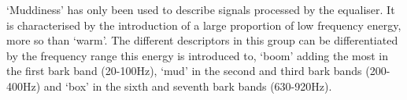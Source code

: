 	`Muddiness' has only been used to describe signals processed by the equaliser. It is characterised by the
	introduction of a large proportion of low frequency energy, more so than `warm'. The different descriptors in this
	group can be differentiated by the frequency range this energy is introduced to, `boom' adding the most in the
	first bark band (20-100Hz), `mud' in the second and third bark bands (200-400Hz) and `box' in the sixth and seventh
	bark bands (630-920Hz).
